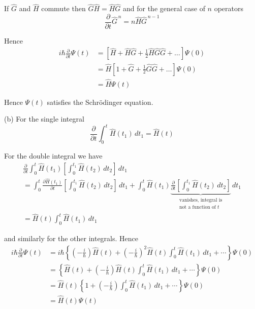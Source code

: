 If $\hat G$ and $\hat H$ commute then $\hat G\hat H=\hat H\hat G$ and
for the general case of $n$ operators
\begin{equation*}
\frac{\partial}{\partial t}\hat G^{\,n}
=n\hat H\hat G^{\,n-1}
\end{equation*}

Hence
\begin{align*}
i\hbar\frac{\partial}{\partial t}\Psi(t)
&=\left[\hat H+\hat H\hat G+\frac{1}{2}\hat H\hat G\hat G+\ldots\right]\Psi(0)
\\
&=\hat H\left[1+\hat G+\frac{1}{2}\hat G\hat G+\ldots\right]\Psi(0)
\\
&=\hat H\Psi(t)
\end{align*}

Hence $\Psi(t)$ satisfies the Schr\"odinger equation.

\bigskip
(b) For the single integral
\begin{equation*}
\frac{\partial}{\partial t}
\int_0^t\hat H(t_1)\,dt_1
=\hat H(t)
\end{equation*}

For the double integral we have
\begin{multline*}
\frac{\partial}{\partial t}
\int_0^t\hat H(t_1)\left[\int_0^{t_1}\hat H(t_2)\,dt_2\right]\,dt_1
\\
=\int_0^t\frac{\partial\hat H(t_1)}{\partial t}
\left[\int_0^{t_1}\hat H(t_2)\,dt_2\right]\,dt_1
+\int_0^t\hat H(t_1)
\underbrace{\frac{\partial}{\partial t}\left[\int_0^{t_1}\hat H(t_2)\,dt_2\right]}
_{\substack{\text{vanishes, integral is}\\ \text{not a function of $t$}}}
\,dt_1
\\
=\hat H(t)\int_0^t\hat H(t_1)\,dt_1
\end{multline*}

and similarly for the other integrals. Hence
\begin{align*}
i\hbar\frac{\partial}{\partial t}\Psi(t)
&=i\hbar\left\{\left(-\frac{i}{\hbar}\right)\hat H(t)+\left(-\frac{i}{\hbar}\right)^2\hat H(t)\int_0^t\hat H(t_1)\,dt_1+\cdots\right\}\Psi(0)
\\
&=\left\{\hat H(t)+\left(-\frac{i}{\hbar}\right)\hat H(t)\int_0^t\hat H(t_1)\,dt_1+\cdots\right\}\Psi(0)
\\
&=\hat H(t)\left\{1+\left(-\frac{i}{\hbar}\right)\int_0^t\hat H(t_1)\,dt_1+\cdots\right\}\Psi(0)
\\
&=\hat H(t)\Psi(t)
\end{align*}


